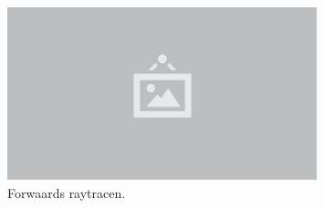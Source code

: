 \begin{figure}
  \centering
  \includegraphics[width=0.8\textwidth]{./img/raw/placeholder.png}
  \caption{Forwaards raytracen.}
  \label{fig:rt-forward}
\end{figure}
